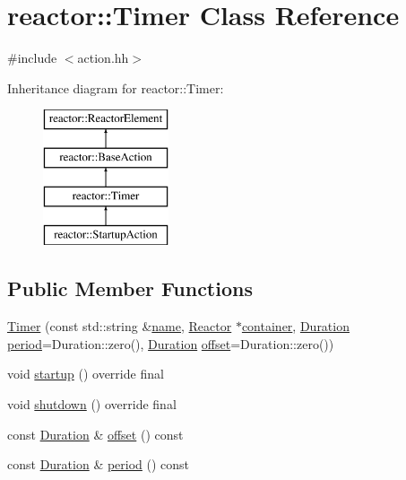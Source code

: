 \hypertarget{classreactor_1_1Timer}{}\section{reactor\+:\+:Timer Class Reference}
\label{classreactor_1_1Timer}


{\ttfamily \#include $<$action.\+hh$>$}

Inheritance diagram for reactor\+:\+:Timer\+:\begin{figure}[H]
\begin{center}
\leavevmode
\includegraphics[height=4.000000cm]{classreactor_1_1Timer}
\end{center}
\end{figure}
\subsection*{Public Member Functions}
\begin{DoxyCompactItemize}
\item 
\hyperlink{classreactor_1_1Timer_a54e32e02f2374d4cb4097618cb6181a2}{Timer} (const std\+::string \&\hyperlink{classreactor_1_1ReactorElement_a99579f61dbaf5d5d98aebfe26eb8bf77}{name}, \hyperlink{classreactor_1_1Reactor}{Reactor} $\ast$\hyperlink{classreactor_1_1ReactorElement_a25bf298de879a82eefc1ba426be05812}{container}, \hyperlink{namespacereactor_aa8375b807a80703545664096c5b5b779}{Duration} \hyperlink{classreactor_1_1Timer_a618e80997d7d4881df1b9e9190dae82d}{period}=Duration\+::zero(), \hyperlink{namespacereactor_aa8375b807a80703545664096c5b5b779}{Duration} \hyperlink{classreactor_1_1Timer_ad88516bbbba6a4380bae74af76611640}{offset}=Duration\+::zero())
\item 
void \hyperlink{classreactor_1_1Timer_af820c0879317afb9b98ddc890ac96271}{startup} () override final
\item 
void \hyperlink{classreactor_1_1Timer_a35f218aab3bf72b87cff4aa984dee991}{shutdown} () override final
\item 
const \hyperlink{namespacereactor_aa8375b807a80703545664096c5b5b779}{Duration} \& \hyperlink{classreactor_1_1Timer_ad88516bbbba6a4380bae74af76611640}{offset} () const
\item 
const \hyperlink{namespacereactor_aa8375b807a80703545664096c5b5b779}{Duration} \& \hyperlink{classreactor_1_1Timer_a618e80997d7d4881df1b9e9190dae82d}{period} () const
\end{DoxyCompactItemize}
